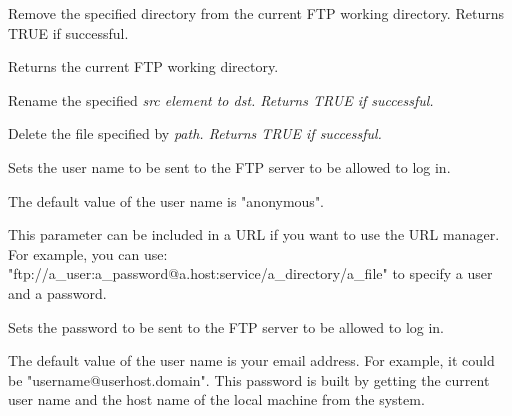 Remove the specified directory from the current FTP working directory.
Returns TRUE if successful.



Returns the current FTP working directory.




Rename the specified \it{src} element to \it{dst}. Returns TRUE if successful.




Delete the file specified by \it{path}. Returns TRUE if successful.




Sets the user name to be sent to the FTP server to be allowed to log in.


The default value of the user name is "anonymous".


This parameter can be included in a URL if you want to use the URL manager.
For example, you can use: "ftp://a_user:a_password@a.host:service/a_directory/a_file"
to specify a user and a password.



Sets the password to be sent to the FTP server to be allowed to log in.


The default value of the user name is your email address. For example, it could
be "username@userhost.domain". This password is built by getting the current
user name and the host name of the local machine from the system.

